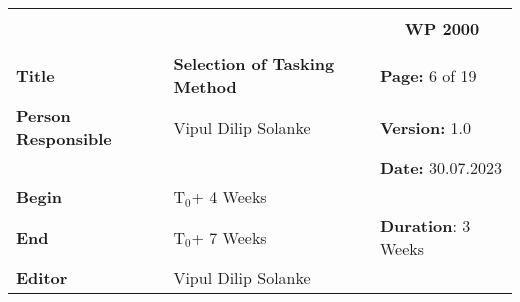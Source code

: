 \begin{table}[!h]
  \begin{center}
    \begin{tabular}{|p{35mm}||p{55mm}|p{50mm}||p{40mm}|}
      \hline
      \multicolumn{3}{|l||}{\textbf{}} & \multicolumn{1}{c|}{}                                                                                                                                                \\
      \multicolumn{3}{|l||}{\textbf{}} & \multicolumn{1}{c|}{\textbf{WP 2000}}                                                                                                                                \\
      \multicolumn{3}{|l||}{\textbf{}} & \multicolumn{1}{c|}{}                                                                                                                                                \\
      \hline\hline
      \textbf{Title}                   & \multicolumn{2}{p{7cm}||}{\textbf{Selection of Tasking Method}}
                                       & \textbf{Page:} 6 of 19                                                                                                                                             \\
      \hline
      \textbf{Person Responsible}        & \multicolumn{2}{l||}{Vipul Dilip Solanke}                                                                                                   & \textbf{Version:} 1.0   \\
      \hline
      \multicolumn{3}{|l||}{}          & \textbf{Date:} 30.07.2023                                                                                                                                          \\
      \hline\hline
      \textbf{Begin}                  & \multicolumn{2}{l||}{T$_0$+ 4 Weeks}                                                                                                                &                         \\
      \hline
      \textbf{End}                    & \multicolumn{2}{l||}{T$_0$+ 7 Weeks}                                                                                                        & \textbf{Duration}: 3 Weeks \\
      \hline\hline
      \textbf{Editor}              & \multicolumn{3}{l|}{Vipul Dilip Solanke}                                                                                                                              \\

\end{tabular}
\end{center}
\end{table}
